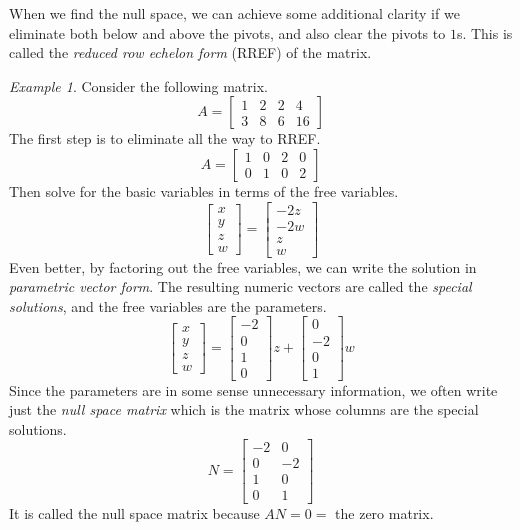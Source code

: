 \documentclass[11pt,oneside]{amsbook}
\theoremstyle{definition}
\theoremstyle{plain}
\theoremstyle{definition}
\theoremstyle{remark}
\newtheorem{example}[theorem]{Example}
\numberwithin{equation}{section}
\numberwithin{figure}{section}
\begin{document}
When we find the null space, we can achieve some additional clarity if we eliminate both below and above the pivots, and also clear the pivots to $1$s. This is called the \emph{reduced row echelon form} (RREF) of the matrix.

\begin{example}
  Consider the following matrix.
  \[A=\begin{bmatrix}1&2&2&4\\3&8&6&16\end{bmatrix}
  \]
  The first step is to eliminate all the way to RREF.
  \[A=\begin{bmatrix}1&0&2&0\\0&1&0&2\end{bmatrix}
  \]
  Then solve for the basic variables in terms of the free variables.
  \[\begin{bmatrix}x\\y\\z\\w\end{bmatrix}
  =\begin{bmatrix}-2z\\-2w\\z\\w\end{bmatrix}
  \]
  Even better, by factoring out the free variables, we can write the solution in \emph{parametric vector form}. The resulting numeric vectors are called the \emph{special solutions}, and the free variables are the parameters.
  \[\begin{bmatrix}x\\y\\z\\w\end{bmatrix}
    =\begin{bmatrix}-2\\0\\1\\0\end{bmatrix}z
    +\begin{bmatrix}0\\-2\\0\\1\end{bmatrix}w
  \]
  Since the parameters are in some sense unnecessary information, we often write just the \emph{null space matrix} which is the matrix whose columns are the special solutions.
  \[N=\begin{bmatrix}-2&0\\0&-2\\1&0\\0&1\end{bmatrix}
  \]
  It is called the null space matrix because $AN=0=$ the zero matrix.
\end{example}
\end{document}
